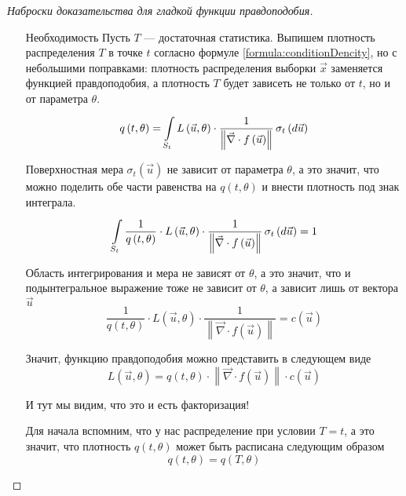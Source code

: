 \begin{proof}[Наброски доказательства для гладкой функции правдоподобия]
\begin{enumerate}
      Условное распределение $\vec{x}$ не зависит от $\theta$
      при известном $T$, что и требовалось доказать для того, чтобы
      показать достаточность факторизации.

      \item[Необходимость]
      Пусть $T$ --- достаточная статистика.
      Выпишем плотность распределения $T$ в точке $t$ согласно формуле
      \eqref{formula:conditionDencity}, но с небольшими поправками:
      плотность распределения выборки $\vec{x}$ заменяется
      функцией правдоподобия, а плотность $T$ будет зависеть не только
      от $t$, но и от параметра $\theta$.
      $$q\left( t, \theta \right)
      = \integrall{S_t}{\sigma_{t}\left(d\vec{u} \right)}{
    L\left( \vec{u}, \theta \right) \cdot \frac{1}{
        \left\| \vec{\nabla}
    \cdot f\left( \vec{u} \right) \right\|}}$$

      Поверхностная мера $\sigma_{t} \left( \vec{u} \right)$ не зависит
      от параметра $\theta$, а это значит, что можно поделить
      обе части равенства на $q\left( t, \theta \right)$ и внести
      плотность под знак интеграла.
      $$\integrall{S_t}{\sigma_{t}\left(d\vec{u} \right)}{
      \frac{1}{q\left( t, \theta \right)}
      \cdot L\left( \vec{u}, \theta \right) \cdot \frac{1}{
    \left\| \vec{\nabla}
        \cdot f\left( \vec{u} \right) \right\|}} = 1$$

      Область интегрирования и мера не зависят от $\theta$, а это значит,
      что и подынтегральное выражение тоже не зависит от $\theta$,
      а зависит лишь от вектора $\vec{u}$
      $$\frac{1}{q\left( t, \theta \right)}
      \cdot L\left( \vec{u}, \theta \right) \cdot \frac{1}{
    \left\| \vec{\nabla} \cdot f\left( \vec{u} \right) \right\|}
      = c\left( \vec{u} \right)$$

      Значит, функцию правдоподобия можно представить в следующем виде
      $$L\left( \vec{u}, \theta \right)
      = q\left( t, \theta \right)
    \cdot \left\| \vec{\nabla}
        \cdot f\left( \vec{u} \right) \right\|
        \cdot c\left( \vec{u} \right)$$

      И тут мы видим, что это и есть факторизация!

      Для начала вспомним, что у нас распределение при условии $T=t$,
      а это значит, что плотность $q\left( t, \theta \right)$
      может быть расписана следующим образом
      $$q\left( t, \theta \right)
      = q\left( T, \theta \right)$$


\end{enumerate}
\end{proof}
